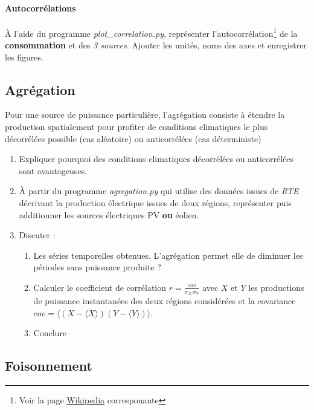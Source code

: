 \documentclass[12pt,a4,french]{article}
\newcommand{\tmtextbf}[1]{{\bfseries{#1}}}
\newcommand{\tmtextit}[1]{{\itshape{#1}}}
\begin{document}
\paragraph{Autocorrélations} À l'aide du programme \tmtextit{plot\_correlation.py}, représenter l'autocorrélation\footnote{Voir la page \href{https://fr.wikipedia.org/wiki/Corr%C3%A9lation_(statistiques)}{Wikipedia} corresponante} de la \tmtextbf{consommation} et des \textit{3 sources}. 
Ajouter les unités, noms des axes et enregistrer les figures. \\

\subsection{Agrégation}

Pour une source de puissance particulière, l'agrégation consiste à étendre la production spatialement pour profiter de conditions climatiques le plus décorrélées possible (cas aléatoire) ou anticorrélées (cas déterministe)
\begin{enumerate}
	\item Expliquer pourquoi des conditions climatiques décorrélées ou anticorrélées sont avantageuses.
	
  \item À partir du programme \tmtextit{agregation.py} qui utilise des
  données issues de \tmtextit{RTE} décrivant la production électrique
  issues de deux régions, représenter puis additionner les sources
  électriques PV \textbf{ou} éolien.
  
  \item Discuter :
  \begin{enumerate}
    \item Les séries temporelles obtenues. L'agrégation permet elle de diminuer les périodes sans puissance produite ?
        
    \item Calculer le coefficient de corrélation $r=\frac{cov}{\sigma_X \, \sigma_Y}$ avec $X$ et $Y$ les productions de puissance instantanées des deux régions considérées et la covariance $cov=\langle (X-\langle X \rangle)(Y-\langle Y \rangle) \rangle$.
    
    \item Conclure
    
  \end{enumerate}
\end{enumerate}

\subsection{Foisonnement}
\end{document}
